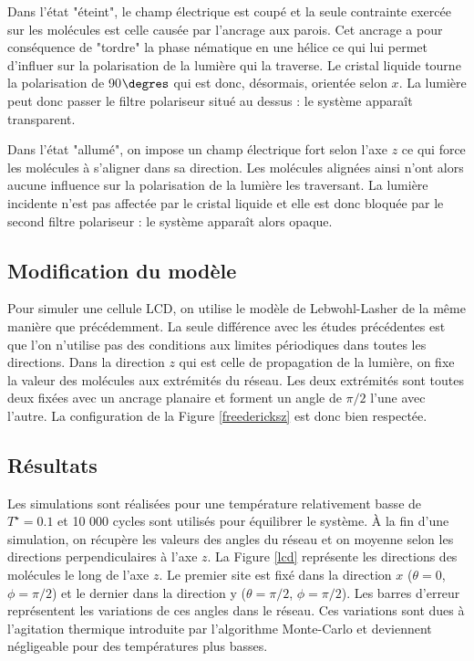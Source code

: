 \documentclass[11pt]{article}
\numberwithin{equation}{section}
\begin{document}
\newpage

Dans l'état "éteint", le champ électrique est coupé et la seule contrainte exercée sur les molécules est celle causée par l'ancrage aux parois. Cet ancrage a pour conséquence de "tordre" la phase nématique en une hélice ce qui lui permet d'influer sur la polarisation de la lumière qui la traverse. Le cristal liquide tourne la polarisation de 90$\degres$ qui est donc, désormais, orientée selon $x$. La lumière peut donc passer le filtre polariseur situé au dessus : le système apparaît transparent.
\medskip


Dans l'état "allumé", on impose un champ électrique fort selon l'axe $z$ ce qui force les molécules à s'aligner dans sa direction. Les molécules alignées ainsi n'ont alors aucune influence sur la polarisation de la lumière les traversant. La lumière incidente n'est pas affectée par le cristal liquide et elle est donc bloquée par le second filtre polariseur : le système apparaît alors opaque.
\medskip

\subsection{Modification du modèle}

Pour simuler une cellule LCD, on utilise le modèle de Lebwohl-Lasher de la même manière que précédemment. La seule différence avec les études précédentes est que l'on n'utilise pas des conditions aux limites périodiques dans toutes les directions. Dans la direction $z$ qui est celle de propagation de la lumière, on fixe la valeur des molécules aux extrémités du réseau. Les deux extrémités sont toutes deux fixées avec un ancrage planaire et forment un angle de $\pi/2$ l'une avec l'autre. La configuration de la Figure \ref{freedericksz} est donc bien respectée.

\subsection{Résultats}

Les simulations sont réalisées pour une température relativement basse de $T^\star =0.1$ et 10 000 cycles sont utilisés pour équilibrer le système. À la fin d'une simulation, on récupère les valeurs des angles du réseau et on moyenne selon les directions perpendiculaires à l'axe $z$. La Figure \ref{lcd} représente les directions des molécules le long de l'axe $z$. Le premier site est fixé dans la direction $x$ ($\theta = 0$, $\phi=\pi/2$) et le dernier dans la direction y ($\theta = \pi/2$, $\phi=\pi/2$). Les barres d'erreur représentent les variations de ces angles dans le réseau. Ces variations sont dues à l'agitation thermique introduite par l'algorithme Monte-Carlo et deviennent négligeable pour des températures plus basses.
\end{document}
